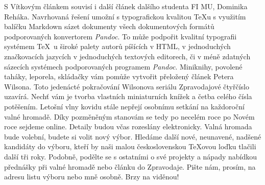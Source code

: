 S Vítkovým článkem souvisí i další článek dalšího studenta FI MU, Dominika Reháka.  Navrhovaná řešení umožní s typografickou kvalitou \TeX u s využitím balíčku Markdown sázet dokumenty všech dokumentových formátů podporovaných konvertorem \emph{Pandoc}.  To může podpořit kvalitní typografii systémem \TeX\ u široké palety autorů píšících v HTML, v jednoduchých značkovacích jazycích v jednoduchých textových editorech, či v méně zdatných sázecích systémech podporovaných programem \emph{Pandoc}.
Miniknihy, povolené taháky, leporela, skládačky vám pomůže vytvořit přeložený článek Petera Wilsona.  Toto jedenácté pokračování Wilsonova seriálu Zpravodajové čtyřčíslo uzavírá.  Nechť vám je tvorba vlastních miniaturních knížek a četba celého čísla potěšením.
Letošní vlny kovidu stále nepřejí osobnímu setkání na každoroční valné hromadě.  Díky pozměněným stanovám se tedy po necelém roce po Novém roce sejdeme online.  Detaily budou včas rozeslány elektronicky.  Valná hromada bude volební, budete si volit nový výbor.  Hledáme další nové, neunavené, nadšené kandidáty do výboru, kteří by naši malou československou \TeX ovou loďku tlačili další tři roky.  Podobně, podělte se s ostatními o své projekty a nápady nabídkou přednášky při valné hromadě nebo článku do Zpravodaje.  Pište nám, prosím, na adresu listu výboru nebo mně osobně.  Brzy na viděnou!

